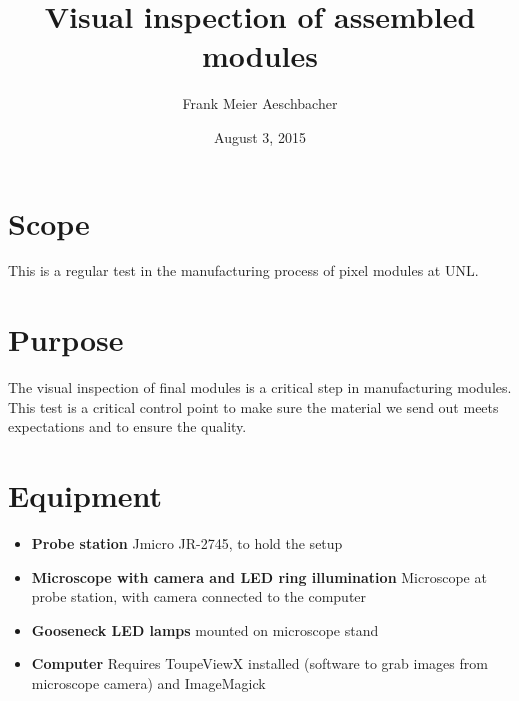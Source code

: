\documentclass[12pt]{unlsilabsop}
\title{Visual inspection of assembled modules}
\date{August 3, 2015}
\author{Frank Meier Aeschbacher}
\begin{document}
\maketitle

\section{Scope}
This is a regular test in the manufacturing process of pixel modules at UNL.

\section{Purpose}
The visual inspection of final modules is a critical step in manufacturing modules. This test is a critical control point to make sure the material we send out meets expectations and to ensure the quality.



\section{Equipment}

\begin{itemize}
\item \textbf{Probe station} Jmicro JR-2745, to hold the setup
\item \textbf{Microscope with camera and LED ring illumination} Microscope at probe station, with camera connected to the computer
\item \textbf{Gooseneck LED lamps} mounted on microscope stand
\item \textbf{Computer} Requires ToupeViewX installed (software to grab images from microscope camera) and ImageMagick
\end{itemize}
\end{document}
